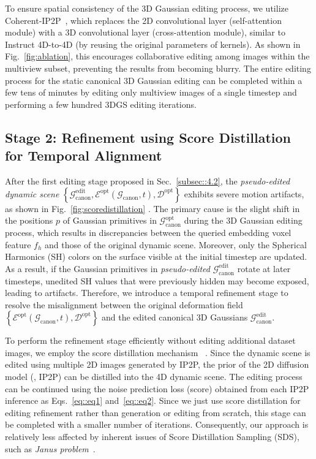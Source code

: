 To ensure spatial consistency of the 3D Gaussian editing process, we utilize Coherent-IP2P~\cite{ref_9_i4d24d, ref_20_mvdream, ref_21_tuneavideo}, which replaces the 2D convolutional layer (self-attention module) with a 3D convolutional layer (cross-attention module), similar to Instruct 4D-to-4D (by reusing the original parameters of kernels). As shown in Fig.~\ref{fig:ablation}, this encourages collaborative editing among images within the multiview subset, preventing the results from becoming blurry. The entire editing process for the static canonical 3D Gaussian editing can be completed within a few tens of minutes by editing only multiview images of a single timestep and performing a few hundred 3DGS editing iterations.


\subsection{Stage 2: Refinement using Score Distillation for Temporal Alignment}
\label{subsec::4.3}
After the first editing stage proposed in Sec.~\ref{subsec::4.2}, the \textit{pseudo-edited dynamic scene} $\left\{\mathcal{G}_{\text{canon}}^\text{edit},\mathcal{E}^\text{opt}(\mathcal{G}_{\text{canon}}, t), \mathcal{D}^\text{opt}\right\}$ exhibits severe motion artifacts, as shown in Fig.~\ref{fig:scoredistillation} . The primary cause is the slight shift in the positions $p$ of Gaussian primitives in $\mathcal{G}_{\text{canon}}^\text{opt}$ during the 3D Gaussian editing process, which results in discrepancies between the queried embedding voxel feature $f_h$ and those of the original dynamic scene. Moreover, only the Spherical Harmonics (SH) colors on the surface visible at the initial timestep are updated. As a result, if the Gaussian primitives in \textit{pseudo-edited} $\mathcal{G}_{\text{canon}}^\text{edit}$ rotate at later timesteps, unedited SH values that were previously hidden may become exposed, leading to artifacts. Therefore, we introduce a temporal refinement stage to resolve the misalignment between the original deformation field $\left\{\mathcal{E}^\text{opt}(\mathcal{G}_{\text{canon}}, t), \mathcal{D}^\text{opt}\right\}$ and the edited canonical 3D Gaussians $\mathcal{G}_{\text{canon}}^\text{edit}$.

To perform the refinement stage efficiently without editing additional dataset images, we employ the score distillation mechanism ~\cite{ref_18_dreamfusion}. Since the dynamic scene is edited using multiple 2D images generated by IP2P, the prior of the 2D diffusion model (\ie, IP2P) can be distilled into the 4D dynamic scene. The editing process can be continued using the noise prediction loss (\ie score) obtained from each IP2P inference as Eqs.~\ref{eq::eq1} and~\ref{eq::eq2}. Since we just use score distillation for editing refinement rather than generation or editing from scratch, this stage can be completed with a smaller number of iterations. Consequently, our approach is relatively less affected by inherent issues of Score Distillation Sampling (SDS), such as \emph{Janus problem}~\cite{ref_20_mvdream}. 


